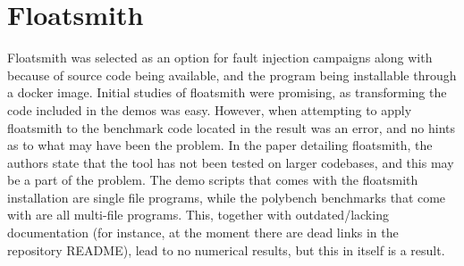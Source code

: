 \section{Floatsmith}

Floatsmith was selected as an option for fault injection campaigns along with \taffo{} because of source code being available, and the program being installable through a docker image. Initial studies of floatsmith were promising, as transforming the code included in the demos was easy. 
However, when attempting to apply floatsmith to the benchmark code located in \taffo{} the result was an error, and no hints as to what may have been the problem. In the paper detailing floatsmith, the authors state that the tool has not been tested on larger codebases, and this may be a part of the problem. The demo scripts that comes with the floatsmith installation are single file programs, while the polybench benchmarks that come with \taffo{} are all multi-file programs. This, together with outdated/lacking documentation (for instance, at the moment there are dead links in the repository README), lead to no numerical results, but this in itself is a result.


